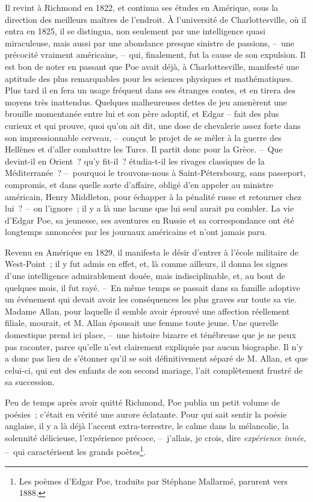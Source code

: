 \documentclass[french,twoside]{book} %
\begin{document}
Il revint à Richmond en 1822, et continua ses études en Amérique, sous la direction des meilleurs maîtres de l’endroit. À l’université de Charlottesville, où il entra en 1825, il se distingua, non seulement par une intelligence quasi miraculeuse, mais aussi par une abondance presque sinistre de passions, – une précocité vraiment américaine, – qui, finalement, fut la cause de son expulsion. Il est bon de noter en passant que Poe avait déjà, à Charlottesville, manifesté une aptitude des plus remarquables pour les sciences physiques et mathématiques. Plus tard il en fera un usage fréquent dans ses étranges contes, et en tirera des moyens très inattendus. Quelques malheureuses dettes de jeu amenèrent une brouille momentanée entre lui et son père adoptif, et Edgar – fait des plus curieux et qui prouve, quoi qu’on ait dit, une dose de chevalerie assez forte dans son impressionnable cerveau, – conçut le projet de se mêler à la guerre des Hellènes et d’aller combattre les Turcs. Il partit donc pour la Grèce. – Que devint-il en Orient ? qu’y fit-il ? étudia-t-il les rivages classiques de la Méditerranée ? – pourquoi le trouvons-nous à Saint-Pétersbourg, sans passeport, compromis, et dans quelle sorte d’affaire, obligé d’en appeler au ministre américain, Henry Middleton, pour échapper à la pénalité russe et retourner chez lui ? – on l’ignore ; il y a là une lacune que lui seul aurait pu combler. La vie d’Edgar Poe, sa jeunesse, ses aventures en Russie et sa correspondance ont été longtemps annoncées par les journaux américains et n’ont jamais paru.\par
Revenu en Amérique en 1829, il manifesta le désir d’entrer à l’école militaire de West-Point ; il y fut admis en effet, et, là comme ailleurs, il donna les signes d’une intelligence admirablement douée, mais indisciplinable, et, au bout de quelques mois, il fut rayé. – En même temps se passait dans sa famille adoptive un événement qui devait avoir les conséquences les plus graves sur toute sa vie. Madame Allan, pour laquelle il semble avoir éprouvé une affection réellement filiale, mourait, et M. Allan épousait une femme toute jeune. Une querelle domestique prend ici place, – une histoire bizarre et ténébreuse que je ne peux pas raconter, parce qu’elle n’est clairement expliquée par aucun biographe. Il n’y a donc pas lieu de s’étonner qu’il se soit définitivement séparé de M. Allan, et que celui-ci, qui eut des enfants de son second mariage, l’ait complètement frustré de sa succession.\par
Peu de temps après avoir quitté Richmond, Poe publia un petit volume de poésies ; c’était en vérité une aurore éclatante. Pour qui sait sentir la poésie anglaise, il y a là déjà l’accent extra-terrestre, le calme dans la mélancolie, la solennité délicieuse, l’expérience précoce, – j’allais, je crois, dire \emph{expérience innée}, – qui caractérisent les grands poètes\footnote{Les poèmes d’Edgar Poe, traduits par Stéphane Mallarmé, parurent vers 1888.}.\par
\end{document}
